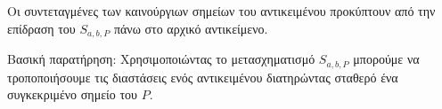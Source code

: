 \begin{solution}
Οι συντεταγμένες των καινούργιων σημείων του αντικειμένου προκύπτουν από την επίδραση του $S_{a,b,P}$ πάνω στο αρχικό αντικείμενο.

Βασική παρατήρηση: Χρησιμοποιώντας το μετασχηματισμό $S_{a,b,P}$ μπορούμε να τροποποιήσουμε τις διαστάσεις ενός αντικειμένου διατηρώντας σταθερό ένα συγκεκριμένο σημείο του $P$.
\end{solution}